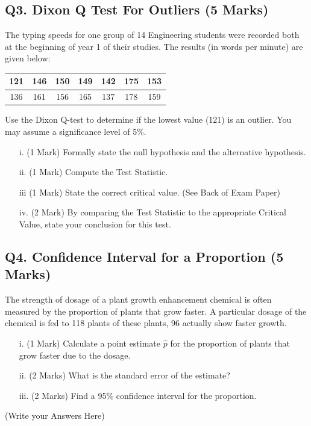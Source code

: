 \documentclass[a4paper,12pt]{article}
\begin{document}
\newpage
\subsection*{Q3. Dixon Q Test For Outliers (5 Marks)}

The typing speeds for one group of 14 Engineering students were recorded both at the beginning of year 1 of their studies. The results (in words per minute) are given below:

\begin{center}
	\begin{tabular}{|c|c|c|c|c|c|c|}
		\hline
		121 & 146 & 150 &149 &142 &175& 153\\ \hline
		136 & 161 & 156& 165& 137& 178& 159
		\\ \hline
	\end{tabular}
\end{center}
Use the Dixon Q-test to determine if the lowest value (121) is an outlier. You may assume a significance level of 5\%.

\begin{itemize}
	\item[i.] (1 Mark) Formally state the null hypothesis and the alternative hypothesis.
	\item[ii.] (1 Mark) Compute the Test Statistic.
	\item[iii] (1 Mark) State the correct critical value. (See Back of Exam Paper)
	\item[iv.] (2 Mark) By comparing the Test Statistic to the appropriate Critical Value, state your conclusion for this test.
\end{itemize}
\newpage

\subsection*{Q4. Confidence Interval for a Proportion (5 Marks)}
The strength of dosage of a plant growth enhancement chemical is often measured by the proportion of plants that grow faster. A particular dosage of the chemical is fed to 118 plants of these plants, 96 actually show faster growth.

\begin{itemize}
	\item[i.] (1 Mark) Calculate a point estimate $\hat{p}$ for the proportion of plants that grow faster due to the dosage. 									 
	\item[ii.] (2 Marks)  What is the standard error of the estimate? 			
	\item[iii.] (2 Marks) Find a 95\% confidence interval for the proportion. 					
\end{itemize}
\newpage
(Write your Answers Here)
\newpage
\end{document}

